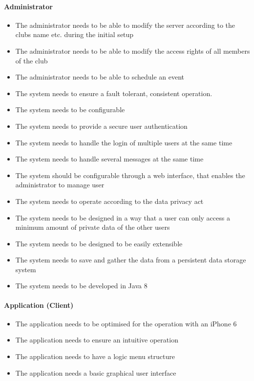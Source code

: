 \paragraph{Administrator}
\begin{itemize}
\item The administrator needs to be able to modify the server according to the clubs name etc. during the initial setup
\item The administrator needs to be able to modify the access rights of all members of the club
\item The administrator needs to be able to schedule an event
\item The system needs to ensure a fault tolerant, consistent operation.
\item The system needs to be configurable
\item The system needs to provide a secure user authentication
\item The system needs to handle the login of multiple users at the same time
\item The system needs to handle several messages at the same time
\item The system should be configurable through a web interface, that enables the administrator to manage user
\item The system needs to operate according to the data privacy act
\item The system needs to be designed in a way that a user can only access a minimum amount of private data of the other users
\item The system needs to be designed to be easily extensible
\item The system needs to save and gather the data from a persistent data storage system
\item The system needs to be developed in Java 8
\end{itemize}

\paragraph{Application (Client)}
\begin{itemize}
\item The application needs to be optimised for the operation with an iPhone 6
\item The application needs to ensure an intuitive operation
\item The application needs to have a logic menu structure
\item The application needs a basic graphical user interface
\end{itemize}

